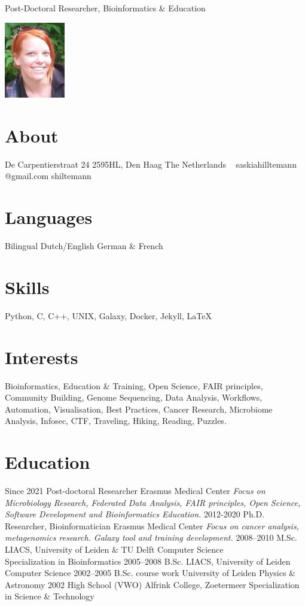 \documentclass[]{shiltemann-cv}
\begin{document}
       {Post-Doctoral Researcher, Bioinformatics \& Education}


\begin{aside}
  \includegraphics[width=75pt]{foto.jpg}
  \section{About}
    De Carpentierstraat 24
    2595HL, Den Haag
    The Netherlands
    ~
    saskiahilltemann @gmail.com \faEnvelope
    shiltemann \faGithub \ \faTwitter \ \faLinkedin
    \
  \section{Languages}
    Bilingual Dutch/English
    German \& French
  \section{Skills}
    Python, C, C++, UNIX, Galaxy, Docker, Jekyll, LaTeX
\end{aside}

\section{Interests}

Bioinformatics, Education \& Training, Open Science, FAIR principles, Community Building, Genome Sequencing, Data Analysis, Workflows, Automation, Visualisation, Best Practices, Cancer Research, Microbiome Analysis, Infosec, CTF, Traveling, Hiking, Reading, Puzzles.

\section{Education}

\begin{entrylist}
  \entry
    {Since 2021}
    {Post-doctoral Researcher}
    {Erasmus Medical Center}
    {\emph{Focus on Microbiology Research, Federated Data Analysis, FAIR principles, Open Science, Software Development and Bioinformatics Education.}}
  \entry
    {2012-2020}
    {Ph.D. Researcher, Bioinformatician}
    {Erasmus Medical Center}
    {\emph{Focus on cancer analysis, metagenomics research. Galaxy tool and training development.}}
  \entry
    {2008–2010}
    {M.Sc.}
    {LIACS, University of Leiden \& TU Delft}
    {Computer Science\\
    Specialization in Bioinformatics}
  \entry
    {2005–2008}
    {B.Sc.}
    {LIACS, University of Leiden}
    {Computer Science}
  \entry
    {2002–2005}
    {B.Sc. course work}
    {University of Leiden}
    {Physics \& Astronomy}
  \entry
    {2002}
    {High School (VWO)}
    {Alfrink College, Zoetermeer}
    {Specialization in Science \& Technology}
\end{entrylist}
\end{document}
